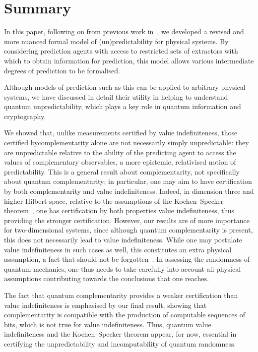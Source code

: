 \documentclass[information,article,accept,moreauthors,pdftex,12pt,a4paper]{mdpi}
\theoremstyle{mdpi}
\newcounter{ex}
\newcounter{re}
\theoremstyle{mdpidefinition}
\begin{document}
\section{Summary}

In this paper, following on from previous work in~\cite{DBLP:conf/birthday/AbbottCS15}, we developed a revised and more nuanced formal model of (un)predictability for physical systems.
By considering prediction agents with access to restricted sets of extractors with which to obtain information for prediction, this model allows various intermediate degrees of prediction to be formalised.

Although models of prediction such as this can be applied to arbitrary physical systems, we have discussed in detail their utility in helping to understand quantum unpredictability, which plays a key role in quantum information and cryptography.

We showed that, unlike measurements certified by value indefiniteness, those certified by\linebreak complementarity alone are not necessarily simply unpredictable: {they are unpredictable relative to the ability of the predicting agent to access the values of complementary observables}, a more epistemic, relativised notion of predictability.
This is a general result about complementarity, not specifically about %
quantum complementarity; in particular, one may aim to have certification by both complementarity and value indefiniteness.
Indeed, in dimension three and higher Hilbert space, relative to the assumptions of the Kochen--Specker theorem~\cite{2012-incomput-proofsCJ}, one has certification by both properties value indefiniteness, thus providing the stronger certification.
However, our results are of more importance for two-dimensional systems, since although quantum complementarity is present, this does not necessarily lead to value indefiniteness.
While one may postulate value indefiniteness in such cases as well, this constitutes an extra physical assumption, a fact that should not be forgotten~\cite{DBLP:conf/birthday/AbbottCS15}.
In assessing the randomness of quantum mechanics, one thus needs to take carefully into account all physical assumptions contributing towards the conclusions that one reaches.

The fact that quantum complementarity provides a weaker certification than value indefiniteness is emphasised by our final result, showing that complementarity is compatible with the production of computable sequences of bits, which is not true for value indefiniteness.
Thus, quantum value indefiniteness and the Kochen--Specker theorem appear, for now, essential in certifying the unpredictability and incomputability of quantum randomness.
\end{document}
